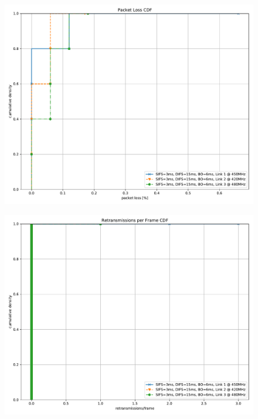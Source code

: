 \documentclass{article}
\begin{document}
\begin{figure}
	\includegraphics[width=\textwidth]{rb_single/cdf/packet_loss_cdf}
\end{figure}

\begin{figure}
	\includegraphics[width=\textwidth]{rb_single/cdf/retransmissions_per_frame_cdf}
\end{figure}
\end{document}
